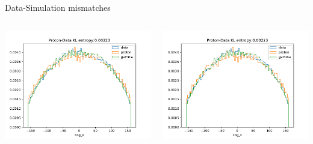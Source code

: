 \begin{frame}[t]{Data-Simulation mismatches}
\begin{columns}[onlytextwidth]
    \begin{column}{0.475\textwidth}
        \includegraphics[width=1.1\textwidth,page=9]{fig/feature_comp_cuts_thresh.pdf}
    \end{column}
    \begin{column}{0.475\textwidth}
        \includegraphics[width=1.1\textwidth,page=17]{fig/feature_comp_cuts_thresh.pdf}
    \end{column}
\end{columns}
\end{frame}

